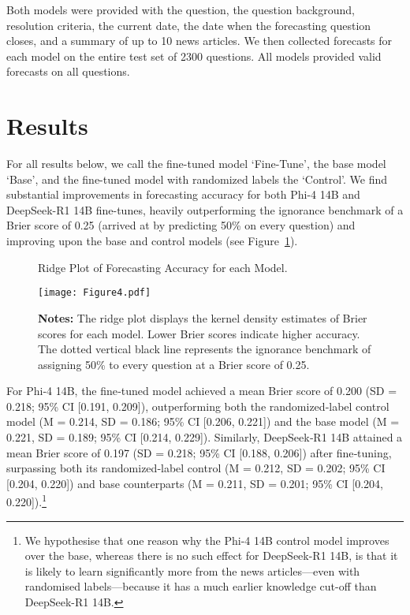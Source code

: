 \documentclass{article}
\begin{document}
Both models were provided with the question, the question background, resolution criteria, the current date, the date when the forecasting question closes, and a summary of up to 10 news articles. We then collected forecasts for each model on the entire test set of 2300 questions. All models provided valid forecasts on all questions.


\section{Results}

For all results below, we call the fine-tuned model ‘Fine-Tune’, the base model ‘Base’, and the fine-tuned model with randomized labels the ‘Control’. We find substantial improvements in forecasting accuracy for both Phi-4 14B and DeepSeek-R1 14B fine-tunes, heavily outperforming the ignorance benchmark of a Brier score of 0.25 (arrived at by predicting 50\% on every question) and improving upon the base and control models (see Figure~\ref{fig:ridge}).

\begin{figure}[htbp]
  \centering
  \captionsetup{position=above} %
  \caption{Ridge Plot of Forecasting Accuracy for each Model.}
  \texttt{[image: Figure4.pdf]}
  \captionsetup{position=below} %
  \caption*{\textbf{Notes:} The ridge plot displays the kernel density estimates of Brier scores for each model. Lower Brier scores indicate higher accuracy. The dotted vertical black line represents the ignorance benchmark of assigning 50\% to every question at a Brier score of 0.25.}
  \label{fig:ridge}
\end{figure}

For Phi‑4 14B, the fine‑tuned model achieved a mean Brier score of 0.200 (SD = 0.218; 95\% CI [0.191, 0.209]), outperforming both the randomized‑label control model (M = 0.214, SD = 0.186; 95\% CI [0.206, 0.221]) and the base model (M = 0.221, SD = 0.189; 95\% CI [0.214, 0.229]). Similarly, DeepSeek‑R1 14B attained a mean Brier score of 0.197 (SD = 0.218; 95\% CI [0.188, 0.206]) after fine‑tuning, surpassing both its randomized‑label control (M = 0.212, SD = 0.202; 95\% CI [0.204, 0.220]) and base counterparts (M = 0.211, SD = 0.201; 95\% CI [0.204, 0.220]).\footnote{We hypothesise that one reason why the Phi-4 14B control model improves over the base, whereas there is no such effect for DeepSeek-R1 14B, is that it is likely to learn significantly more from the news articles—even with randomised labels—because it has a much earlier knowledge cut-off than DeepSeek-R1 14B.}
\end{document}
